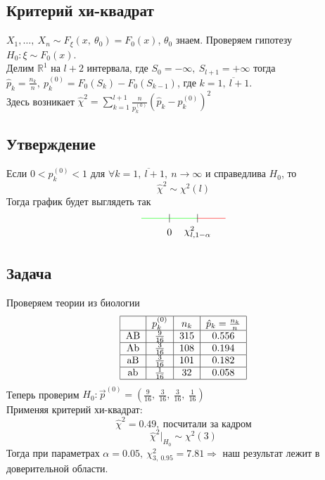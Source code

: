 \documentclass[12pt, a4paper]{article}
\begin{document}
\subsection*{Критерий хи-квадрат}
$X_1,\dots,\ X_n \sim F_{\xi}(x,\ \theta_0) = F_0(x)$, $\theta_0$ знаем. Проверяем гипотезу $H_0: \xi \sim F_0(x)$.\\
Делим $\mathbb{R}^1$ на $l + 2$ интервала, где $S_0 = -\infty,\ S_{l + 1} = +\infty$ тогда $\hat p_k = \frac{n_k}{n},\ p_k^{(0)} = F_0(S_k) - F_0(S_{k - 1})$, где $k = \overline{1,\ l + 1}$.\\
Здесь возникает $\hat \chi^2 = \sum_{k = 1}^{l + 1} \frac{n}{p^{(0)}_k} \left( \hat p_k - p_k^{(0)}\right)^2$
\subsection*{Утверждение}
Если $0 < p_k^{(0)} < 1$ для $\forall k = \overline{1,\ l + 1},\ n \to \infty$ и справедлива $H_0$, то 
\[\hat \chi^2 \sim \chi^2 (l)\] 
Тогда график будет выглядеть так
\[\begin{tikzpicture}
    \draw[green] (-1, 0) -- (0, 0);
    \draw[green] (0, 0) -- (1, 0);
    \draw[red] (1, 0) -- (2, 0);
    \draw (0, -0.15) -- ++(0, 0.3);
    \node at (0, -0.5) (a) {$0$};
    \draw (1, -0.15) -- ++(0, 0.3);
    \node at (1, -0.5) (a) {$\chi^2_{l, 1 - \alpha}$};
\end{tikzpicture}\]
\subsection*{Задача}
Проверяем теории из биологии
\[\begin{tabular}{|c|c|c|c|}
    \hline
   & $p_{k}^{(0)}$ & $n_k$ & $\hat p_k = \frac{n_k}{n}$\\\hline
AB & $\frac{9}{16}$ & 315 & 0.556\\    \hline
Ab & $\frac{3}{16}$ & 108 & 0.194\\    \hline
aB & $\frac{3}{16}$ & 101 & 0.182\\    \hline
ab & $\frac{1}{16}$ & 32  & 0.058\\    \hline
\end{tabular}\]
Теперь проверим $H_0: \vec{p}^{(0)} = \left( \frac{9}{16},\ \frac{3}{16},\ \frac{3}{16},\ \frac{1}{16} \right)$\\
Применяя критерий хи-квадрат:
\[\hat \chi^2 = 0.49,\ \text{посчитали за кадром}\]
\[\hat \chi^2 \big|_{H_0} \sim \chi^2 (3)\]
Тогда при параметрах $\alpha = 0.05,\ \chi^2_{3,\ 0.95} = 7.81\Rightarrow$ наш результат лежит в доверительной области.
\end{document}

